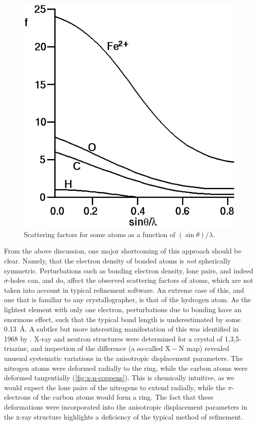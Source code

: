 \begin{refsection}
\begin{figure}
    \centering
    \includegraphics[width=0.5\linewidth]{Figures/scatterf.png}
    \caption{Scattering factors for some atoms as a function of $(\sin\theta)/\lambda$.}
    \label{fig:scatterf}
\end{figure}

From the above discussion, one major shortcoming of this approach should be clear.
Namely, that the electron density of bonded atoms is \emph{not} spherically symmetric.
Perturbations such as bonding electron density, lone pairs, and indeed $\sigma$-holes can, and do, affect the observed scattering factors of atoms, which are not taken into account in typical refinement software.
An extreme case of this, and one that is familiar to any crystallographer, is that of the hydrogen atom.
As the lightest element with only one electron, perturbations due to bonding have an enormous effect, such that the typical  bond length is underestimated by some 0.13~\AA.\autocite{Cooper2010}
A subtler but more interesting manifestation of this was identified in 1968 by \citeauthor{Coppens1968EvidenceEffects}.\autocite{Coppens1968EvidenceEffects}
X-ray and neutron structures were determined for a crystal of 1,3,5-triazine, and inspection of the difference (a so-called $\mathrm{X}-\mathrm{N}$ map) revealed unusual systematic variations in the anisotropic displacement parameters.
The nitrogen atoms were deformed radially to the ring, while the carbon atoms were deformed tangentially (\cref{fig:x-n-coppens}).
This is chemically intuitive, as we would expect the lone pairs of the nitrogens to extend radially, while the $\pi$-electrons of the carbon atoms would form a ring.
The fact that these deformations were incorporated into the anisotropic displacement parameters in the x-ray structure highlights a deficiency of the typical method of refinement.


\end{refsection}
